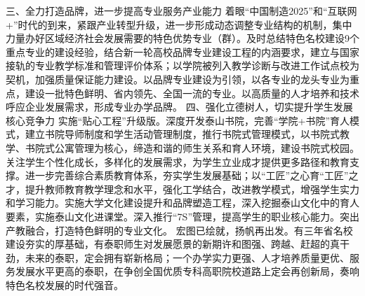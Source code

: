 三、全力打造品牌，进一步提高专业服务产业能力
着眼“中国制造2025”和“互联网+”时代的到来，紧跟产业转型升级，进一步形成动态调整专业结构的机制，集中力量办好区域经济社会发展需要的特色优势专业（群）。及时总结特色名校建设9个重点专业的建设经验，结合新一轮高校品牌专业建设工程的内涵要求，建立与国家接轨的专业教学标准和管理评价体系；以学院被列入教学诊断与改进工作试点校为契机，加强质量保证能力建设。以品牌专业建设为引领，以各专业的龙头专业为重点，建设一批特色鲜明、省内领先、全国一流的专业。以高质量的人才培养和技术呼应企业发展需求，形成专业办学品牌。
四、强化立德树人，切实提升学生发展核心竞争力
实施“贴心工程”升级版。深度开发泰山书院，完善“学院+书院”育人模式，建立书院导师制度和学生活动管理制度，推行书院式管理模式，以书院式教学、书院式公寓管理为核心，缔造和谐的师生关系和育人环境，建设书院式校园。关注学生个性化成长，多样化的发展需求，为学生立业成才提供更多路径和教育支撑。进一步完善综合素质教育体系，夯实学生发展基础；以“工匠”之心育“工匠”之才，提升教师教育教学理念和水平，强化工学结合，改进教学模式，增强学生实力和学习能力。实施大学文化建设提升和品牌塑造工程，深入挖掘泰山文化中的育人要素，实施泰山文化进课堂。深入推行“7S”管理，提高学生的职业核心能力。突出产教融合，打造特色鲜明的专业文化。
宏图已绘就，扬帆再出发。有三年省名校建设夯实的厚基础，有泰职师生对发展愿景的新期许和图强、跨越、赶超的真干劲，未来的泰职，定会拥有崭新格局；一个办学实力更强、人才培养质量更优、服务发展水平更高的泰职，在争创全国优质专科高职院校道路上定会再创新局，奏响特色名校发展的时代强音。



